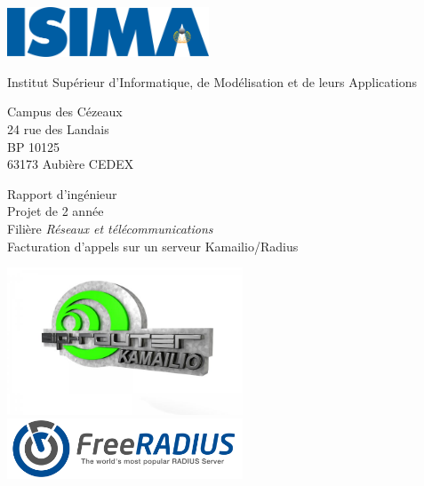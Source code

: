 \thispagestyle{empty}

\includegraphics[width=6cm]{images/isima.png}

\vspace{1cm}

\begin{minipage}{4cm}
\begin{flushleft}
	Institut Supérieur d’Informatique, de Modélisation et de leurs Applications
	
	\vspace{0.5cm}
	
	\small{ Campus des Cézeaux \\ 24 rue des Landais \\ BP 10125 \\ 63173 Aubière CEDEX }
\end{flushleft}
\end{minipage}

\vspace{3cm}

\begin{center}
	Rapport d’ingénieur \\
	Projet de 2{\ieme} année \\
	Filière {\em{Réseaux et télécommunications}} \\
	\Large{Facturation d’appels sur un serveur Kamailio/Radius}
\end{center}

\vspace{1cm}

\begin{center}
\includegraphics[width=7cm, valign=m]{images/logo-kamailio.jpg}
\includegraphics[width=7cm, valign=m]{images/logo-freeradius.png}
\end{center}

